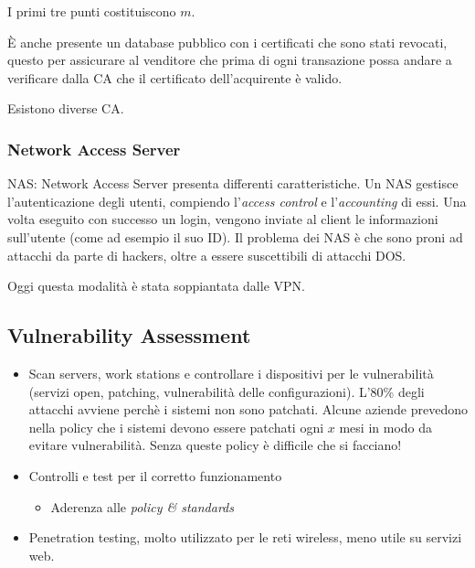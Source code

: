 I primi tre punti costituiscono $m$.

È anche presente un database pubblico con i certificati che sono stati revocati,
questo per assicurare al venditore che prima di ogni transazione possa andare a
verificare dalla CA che il certificato dell'acquirente è valido.

Esistono diverse CA.


\subsubsection{Network Access Server}

NAS: Network Access Server presenta differenti caratteristiche. Un NAS gestisce
l'autenticazione degli utenti, compiendo l'\textit{access control} e
l'\textit{accounting} di essi. Una volta eseguito con successo un login,
vengono inviate al client le informazioni sull'utente (come ad esempio il suo
ID).
Il problema dei NAS \`e che sono proni ad attacchi da parte di hackers, oltre a
essere suscettibili di attacchi DOS.

Oggi questa modalità \`e stata soppiantata dalle VPN.

\subsection{Vulnerability Assessment}

\begin{itemize}
\item Scan servers, work stations e controllare i dispositivi per le
vulnerabilità (servizi open, patching, vulnerabilità delle configurazioni).
L'80\% degli attacchi avviene perchè i sistemi non sono patchati. Alcune aziende
prevedono nella policy che i sistemi devono essere patchati ogni $x$ mesi in
modo da evitare vulnerabilità. Senza queste policy è difficile che si facciano!
\item Controlli e test per il corretto funzionamento
\begin{itemize}
 \item Aderenza alle \textit{policy \& standards}
\end{itemize}
\item Penetration testing, molto utilizzato per le reti wireless, meno utile su
servizi web.
\end{itemize}


